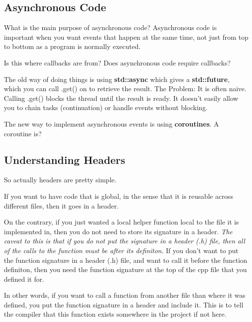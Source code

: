 \documentclass{article}
\begin{document}
\subsection*{Asynchronous
Code}
\par What is the main purpose of asynchronous code? Asynchronous code
is important when you want events that happen at the same time, not
just from top to bottom as a program is normally executed.

\par Is this where callbacks are from? Does asynchronous code require callbacks?

\par The old way of doing things is using \textbf{std::async} which
gives a \textbf{std::future}, which you can call .get() on to
retrieve the result. The Problem: It is often naive. Calling .get()
blocks the thread until the result is ready. It doesn't easily allow
you to chain tasks (continuation) or handle events without blocking.

\par The new way to implement asynchronous events is using
\textbf{coroutines}. A coroutine is?

\subsection*{Understanding
Headers}
\par So actually headers are pretty simple.

\par If you want to have code that is global, in the sense that it is
reusable across different files, then it goes in a header.

\par On the contrary, if you just wanted a local helper function
local to the file it is implemented in, then you do not need to store
its signature in a header. \textit{The caveat to this is that if you
do not put the signature in a header (.h) file, then all of the calls
to the function must be after its definiton.} If you don't want to
put the function signature in a header (.h) file, and want to call it before
the function definiton, then you need the function signature at the
top of the cpp file that you defined it for.

\par In other words, if you want to call a function from another file
than where it was defined, you put the function signature in a header
and include it. This is to tell the compiler that this function
exists somewhere in the project if not here.
\end{document}
